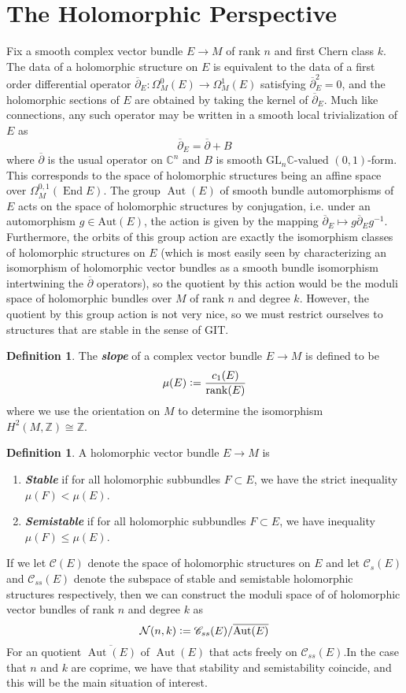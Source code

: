 \documentclass[psamsfonts, 12pt]{amsart}
\theoremstyle{definition}
\newtheorem{defn}[thm]{Definition}
\theoremstyle{remark}
\newcommand{\ib}[1]{\textbf{\textit{#1}}}
\newcommand{\Z}{\mathbb{Z}}
\newcommand{\C}{\mathbb{C}}
\newcommand{\dbar}{\overline{\partial}}
\newcommand{\GL}{\mathrm{GL}}
\newcommand{\inv}{^{-1}}
\newcommand{\defeq}{\vcentcolon=}
\DeclareMathOperator{\Aut}{Aut}
\DeclareMathOperator{\End}{End}
\begin{document}
\section{The Holomorphic Perspective}
%
Fix a smooth complex vector bundle $E \to M$ of rank $n$ and first Chern class $k$.
The data of a holomorphic structure on $E$ is equivalent to the data of a first
order differential operator $\dbar_E : \Omega^0_M(E) \to \Omega^1_M(E)$ satisfying
$\dbar_E^2 = 0$, and the holomorphic sections of $E$ are obtained by taking the
kernel of $\dbar_E$. Much like connections, any such operator may be written in
a smooth local trivialization of $E$ as
\[
\dbar_E = \dbar + B
\]
where $\dbar$ is the usual operator on $\C^n$ and $B$ is smooth $\GL_n\C$-valued
$(0,1)$-form. This corresponds to the space of holomorphic structures being an
affine space over $\Omega_M^{0,1}(\End E)$. The group $\Aut(E)$ of smooth bundle
automorphisms of $E$ acts on the space of holomorphic structures by conjugation, i.e.
under an automorphism $g \in \mathrm{Aut}(E)$, the action is given by the mapping
$\dbar_E \mapsto g\dbar_E g\inv$. Furthermore, the orbits of this group action are
exactly the isomorphism classes of holomorphic structures on $E$ (which is most
easily seen by characterizing an isomorphism of holomorphic vector bundles as
a smooth bundle isomorphism intertwining the $\dbar$ operators), so the quotient by
this action would be the moduli space of holomorphic bundles over $M$ of rank $n$ and
degree $k$. However, the quotient by this group action is not very nice, so we must
restrict ourselves to structures that are stable in the sense of GIT.
%
\begin{defn}
The \ib{slope} of a complex vector bundle $E \to M$ is defined to be
\[
\mu(E) \defeq \frac{c_1(E)}{\mathrm{rank}(E)}
\]
where we use the orientation on $M$ to determine the isomorphism $H^2(M,\Z) \cong \Z$.
\end{defn}
%
\begin{defn}
A holomorphic vector bundle $E \to M$ is
\begin{enumerate}
  \item \ib{Stable} if for all holomorphic subbundles $F \subset E$, we have the
  strict inequality $\mu(F) < \mu(E)$.
  \item \ib{Semistable} if for all holomorphic subbundles $F \subset E$, we have
  inequality $\mu(F) \leq \mu(E)$.
\end{enumerate}
\end{defn}
%
If we let $\mathscr{C}(E)$ denote the space of holomorphic structures on $E$ and let
$\mathscr{C}_s(E)$ and $\mathscr{C}_{ss}(E)$ denote the subspace of stable and
semistable holomorphic structures respectively, then we can construct the moduli space
of of holomorphic vector bundles of rank $n$ and degree $k$ as
\[
\mathcal{N}(n,k) \defeq \mathscr{C}_{ss}(E)/\overline{\Aut(E)}
\]
For an quotient $\overline{\Aut(E)}$ of $\Aut(E)$ that acts freely on
$\mathscr{C}_{ss}(E)$.In the case that $n$ and $k$ are coprime, we have that stability
and semistability coincide, and this will be the main situation of interest. \\
\end{document}
